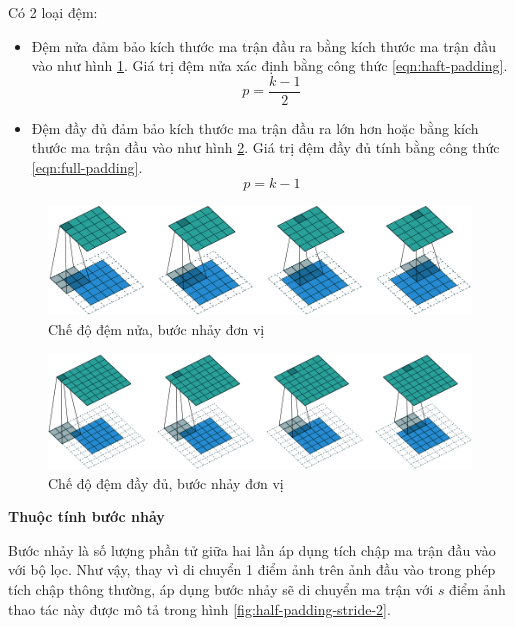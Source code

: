 Có 2 loại đệm:
\begin{itemize}
	\item Đệm nửa đảm bảo kích thước ma trận đầu ra bằng kích thước ma trận đầu vào như hình \ref{fig:half-padding-unit-stride1}. Giá trị đệm nửa xác định bằng công thức \ref{eqn:haft-padding}.
	\begin{equation}\label{eqn:haft-padding}
		p = \frac{k-1}{2}
	\end{equation}
	\item Đệm đầy đủ đảm bảo kích thước ma trận đầu ra lớn hơn hoặc bằng kích thước ma trận đầu vào như hình \ref{fig:full-padding-unit-stride}. Giá trị đệm đầy đủ tính bằng công thức \ref{eqn:full-padding}.
	\begin{equation}\label{eqn:full-padding}
		p = k-1
	\end{equation}
\end{itemize}
\begin{figure}
	\centering
	\includegraphics[width=0.9\linewidth]{images/half-padding-unit-stride1}
	\caption{Chế độ đệm nửa, bước nhảy đơn vị}
	\label{fig:half-padding-unit-stride1}
\end{figure}

\begin{figure}
	\centering
	\includegraphics[width=0.9\linewidth]{images/full-padding-unit-stride}
	\caption{Chế độ đệm đầy đủ, bước nhảy đơn vị}
	\label{fig:full-padding-unit-stride}
\end{figure}

\textbf{Thuộc tính bước nhảy}

Bước nhảy là số lượng phần tử giữa hai lần áp dụng tích chập ma trận đầu vào với bộ lọc. Như vậy, thay vì di chuyển 1 điểm ảnh trên ảnh đầu vào trong phép tích chập thông thường, áp dụng bước nhảy sẽ di chuyển ma trận với $s$ điểm ảnh thao tác này được mô tả trong hình \ref{fig:half-padding-stride-2}.

